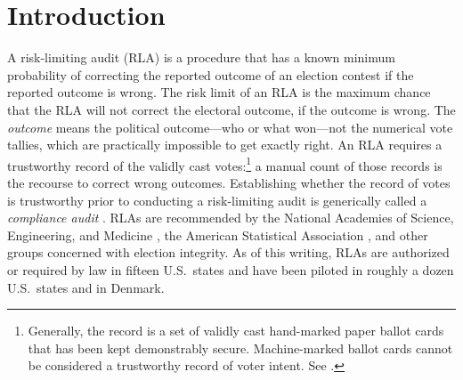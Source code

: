 \documentclass[aoas]{imsart}
\begin{document}

\maketitle

\section{Introduction}
A risk-limiting audit (RLA) is a procedure that has a known minimum probability of correcting the reported outcome of an election
contest if the reported outcome is wrong.
The risk limit of an RLA is the maximum chance that the RLA will not correct the electoral outcome, if the outcome is wrong.
The \emph{outcome} means the political outcome---who or what won---not the numerical vote tallies, which are practically impossible
to get exactly right.
An RLA requires a trustworthy record of the validly cast votes:\footnote{%
Generally, the record is a set of validly cast hand-marked paper ballot cards that has been kept demonstrably secure.
Machine-marked ballot cards cannot be considered a trustworthy record of voter intent.
See \citet{appelEtal20,appelStark20,starkWagner12}.
}
a manual count of those records is the recourse to correct
wrong outcomes.
Establishing whether the record of votes is trustworthy prior to conducting a risk-limiting audit is 
generically called a \emph{compliance audit} 
\citep{starkWagner12,appelStark20}.
RLAs are recommended by the National Academies of Science, Engineering, and Medicine \citep{nas18},
the American Statistical Association \citep{asa10}, and other groups concerned with election integrity.
As of this writing, RLAs are authorized or required by law in fifteen U.S.\ states and have been piloted in 
roughly a dozen U.S.\ states and in Denmark.
\end{document}
